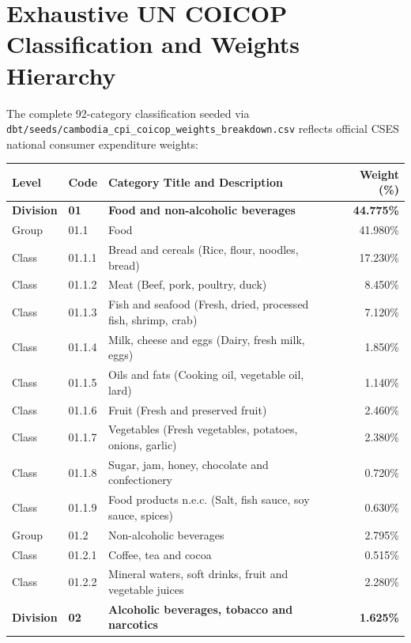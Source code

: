 \documentclass[11pt,a4paper]{article}
\begin{document}
\newpage

\section{Exhaustive UN COICOP Classification and Weights Hierarchy}

The complete 92-category classification seeded via \texttt{dbt/seeds/cambodia\_cpi\_coicop\_weights\_breakdown.csv} reflects official CSES national consumer expenditure weights:

\begin{longtable}{llp{7.5cm}r}
\toprule
\textbf{Level} & \textbf{Code} & \textbf{Category Title and Description} & \textbf{Weight (\%)} \\
\midrule
\endhead
\textbf{Division} & \textbf{01} & \textbf{Food and non-alcoholic beverages} & \textbf{44.775\%} \\
Group & 01.1 & Food & 41.980\% \\
Class & 01.1.1 & Bread and cereals (Rice, flour, noodles, bread) & 17.230\% \\
Class & 01.1.2 & Meat (Beef, pork, poultry, duck) & 8.450\% \\
Class & 01.1.3 & Fish and seafood (Fresh, dried, processed fish, shrimp, crab) & 7.120\% \\
Class & 01.1.4 & Milk, cheese and eggs (Dairy, fresh milk, eggs) & 1.850\% \\
Class & 01.1.5 & Oils and fats (Cooking oil, vegetable oil, lard) & 1.140\% \\
Class & 01.1.6 & Fruit (Fresh and preserved fruit) & 2.460\% \\
Class & 01.1.7 & Vegetables (Fresh vegetables, potatoes, onions, garlic) & 2.380\% \\
Class & 01.1.8 & Sugar, jam, honey, chocolate and confectionery & 0.720\% \\
Class & 01.1.9 & Food products n.e.c. (Salt, fish sauce, soy sauce, spices) & 0.630\% \\
Group & 01.2 & Non-alcoholic beverages & 2.795\% \\
Class & 01.2.1 & Coffee, tea and cocoa & 0.515\% \\
Class & 01.2.2 & Mineral waters, soft drinks, fruit and vegetable juices & 2.280\% \\
\midrule
\textbf{Division} & \textbf{02} & \textbf{Alcoholic beverages, tobacco and narcotics} & \textbf{1.625\%} \\

\end{longtable}
\end{document}
